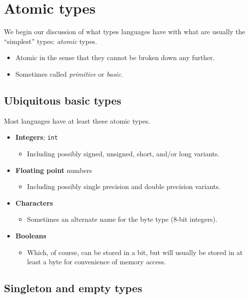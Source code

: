 \documentclass[11pt]{article}
\theoremstyle{definition}
\begin{document}
\section{Atomic types}
\label{sec:orgde4faed}

We begin our discussion of what types languages have
with what are usually the “simplest” types: \emph{atomic} types.
\begin{itemize}
\item Atomic in the sense that they cannot be broken down any further.
\item Sometimes called \emph{primitive} or \emph{basic}.
\end{itemize}

\subsection{Ubiquitous basic types}
\label{sec:orgfb47e85}

Most languages have at least these atomic types.
\begin{itemize}
\item \textbf{Integers}; \texttt{int}
\begin{itemize}
\item Including possibly signed, unsigned, short, and/or long variants.
\end{itemize}
\item \textbf{Floating point} numbers
\begin{itemize}
\item Including possibly single precision and double precision variants.
\end{itemize}
\item \textbf{Characters}
\begin{itemize}
\item Sometimes an alternate name for the byte type (8-bit integers).
\end{itemize}
\item \textbf{Booleans}
\begin{itemize}
\item Which, of course, can be stored in a bit,
but will usually be stored in at least a byte for
convenience of memory access.
\end{itemize}
\end{itemize}

\subsection{Singleton and empty types}
\label{sec:org73994e0}
\end{document}
